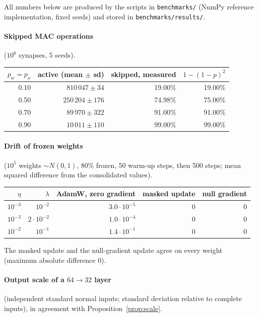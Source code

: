 \documentclass[11pt,a4paper]{article}
\theoremstyle{definition}
\theoremstyle{remark}
\begin{document}
All numbers below are produced by the scripts in \texttt{benchmarks/} (NumPy
reference implementation, fixed seeds) and stored in
\texttt{benchmarks/results/}.

\paragraph{Skipped MAC operations} ($10^6$ synapses, 5 seeds).\quad

\begin{center}
\begin{tabular}{rrrr}
\toprule
$p_w=p_x$ & active (mean $\pm$ sd) & skipped, measured & $1-(1-p)^2$\\
\midrule
0.10 & $810\,047\pm34$ & 19.00\% & 19.00\%\\
0.50 & $250\,204\pm176$ & 74.98\% & 75.00\%\\
0.70 & $89\,970\pm322$ & 91.00\% & 91.00\%\\
0.90 & $10\,011\pm110$ & 99.00\% & 99.00\%\\
\bottomrule
\end{tabular}
\end{center}

\paragraph{Drift of frozen weights} ($10^5$ weights $\sim N(0,1)$, 80\% frozen,
50 warm-up steps, then 500 steps; mean squared difference from the
consolidated values).\quad

\begin{center}
\begin{tabular}{rrrrr}
\toprule
$\eta$ & $\lambda$ & AdamW, zero gradient & masked update & null gradient\\
\midrule
$10^{-3}$ & $10^{-2}$ & $3.0\cdot10^{-5}$ & 0 & 0\\
$10^{-3}$ & $2\cdot10^{-2}$ & $1.0\cdot10^{-4}$ & 0 & 0\\
$10^{-2}$ & $10^{-1}$ & $1.4\cdot10^{-1}$ & 0 & 0\\
\bottomrule
\end{tabular}
\end{center}
The masked update and the null-gradient update agree on every weight (maximum
absolute difference $0$).

\paragraph{Output scale of a $64\to32$ layer} (independent standard normal
inputs; standard deviation relative to complete inputs), in agreement with
Proposition~\ref{prop:scale}.\quad
\end{document}
